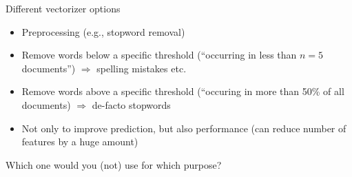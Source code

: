 \documentclass[compress]{beamer}
\begin{document}
\begin{frame}{Different vectorizer options}
	\begin{itemize}
		\item Preprocessing (e.g., stopword removal)
		\item Remove words below a specific threshold (``occurring in less than $n=5$ documents'') $\Rightarrow$ spelling mistakes etc.
		\item Remove words above a specific threshold (``occuring in more than 50\% of all documents) $\Rightarrow$ de-facto stopwords
		\item Not only to improve prediction, but also performance (can reduce number of features by a huge amount)
	\end{itemize}
\end{frame}








\begin{frame}{Which one would you (not) use for which purpose?}
	
\end{frame}
\end{document}
